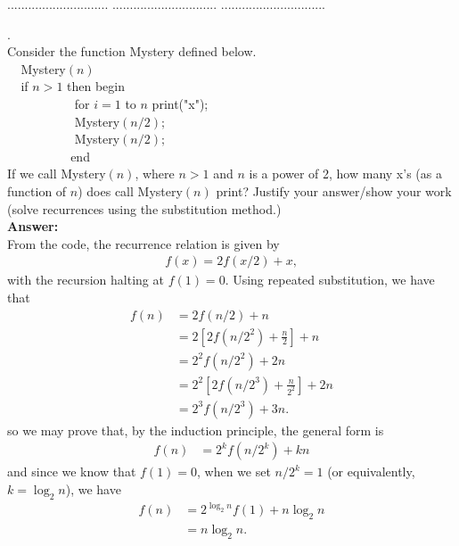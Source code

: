 \documentclass[a4paper,11pt]{article}
\begin{document}
\pagebreak
{} $.............................$
 $..............................$
          $..............................$\\

\bigskip

.\\
Consider the function Mystery defined below.\\
\noindent
$~~~~~$Mystery$(n)$\\
$~~~~~$if $n > 1$ then
 begin\\
$~~~~~~~~~~~~~~~~~~~~~~~$ for $i=1$ to $n$ print("x");\\
$~~~~~~~~~~~~~~~~~~~~~~~$ Mystery$(n/2);$  \\
$~~~~~~~~~~~~~~~~~~~~~~~$ Mystery$(n/2); $ \\ 
$~~~~~~~~~~~~~~~~~~~~~~~$end\\
If we call Mystery$(n)$, where $n>1$ and $n$ is a power of 2, how many x's (as a function of $n$)
does call Mystery$(n)$ print?
Justify your answer/show your work
(solve recurrences using the substitution method.)\\
{\bf Answer:}\\
From the code, the recurrence relation is given by
\begin{align*}
    f(x) = 2f(x/2) + x,
\end{align*}
with the recursion halting at $f(1) = 0$. Using repeated substitution, we have that
\begin{align*}
    f(n) &= 2f(n/2) + n \\
    &= 2 \left[ 2f(n/2^2) + \frac{n}{2} \right] + n \\
    &= 2^2f(n/2^2) + 2n \\
    &= 2^2 \left[ 2f(n/2^3) + \frac{n}{2^2} \right] + 2n \\
    &= 2^3f(n/2^3) + 3n.
\end{align*}
so we may prove that, by the induction principle, the general form is
\begin{align*}
    f(n) &= 2^kf(n/2^k) + kn
\end{align*}
and since we know that $f(1) = 0$, when we set $n/2^k = 1$ (or equivalently, $k = \log_2 n$), we have
\begin{align*}
    f(n) &= 2^{\log_2 n} f(1) + n \log_2 n \\
    &= n \log_2 n.
\end{align*}
 
\end{document}
